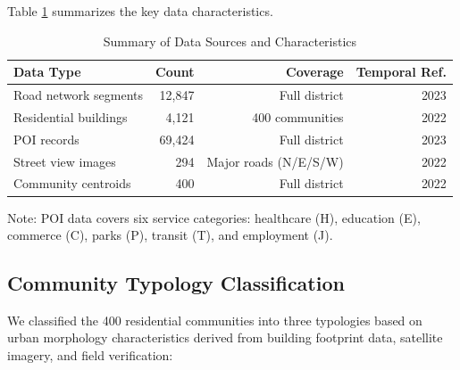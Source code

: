 \documentclass[10pt,conference,compsoc]{IEEEtran}
\begin{document}
Table \ref{tab:data_summary} summarizes the key data characteristics.

\begin{table}[htbp]
\caption{Summary of Data Sources and Characteristics}
\label{tab:data_summary}
\begin{center}
\begin{threeparttable}
\begin{tabular}{lrrr}
\toprule
Data Type & Count & Coverage & Temporal Ref. \\
\midrule
Road network segments & 12,847 & Full district & 2023 \\
Residential buildings & 4,121 & 400 communities & 2022 \\
POI records & 69,424 & Full district & 2023 \\
Street view images & 294 & Major roads (N/E/S/W) & 2022 \\
Community centroids & 400 & Full district & 2022 \\
\bottomrule
\end{tabular}
\begin{tablenotes}
\item Note: POI data covers six service categories: healthcare (H), education (E), commerce (C), parks (P), transit (T), and employment (J).
\end{tablenotes}
\end{threeparttable}
\end{center}
\end{table}

\subsection{Community Typology Classification}

We classified the 400 residential communities into three typologies based on urban morphology characteristics derived from building footprint data, satellite imagery, and field verification:
\end{document}

